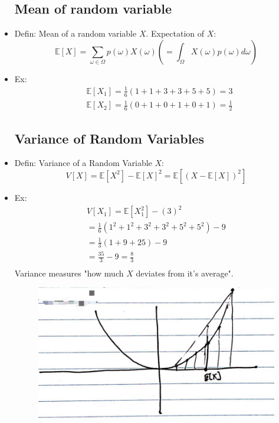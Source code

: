 \begin{itemize}
\subsection{Mean of  random variable}
\item Defin: Mean of a random variable $X$. \newline
Expectation of $X$: 
$$
\mathbb{E}[X]=\sum_{\omega \in \Omega} p(\omega) X(\omega)\left(=\int_{\Omega} X(\omega) p(\omega) d \omega\right)
$$
\item Ex: 
 $$\begin{aligned}
& \mathbb{E}\left[X_{1}\right]=\frac{1}{6}(1+1+3+3+5+5)=3 \\
& \mathbb{E}\left[X_{2}\right]=\frac{1}{6}(0+1+0+1+0+1)=\frac{1}{2}
\end{aligned}
$$
\subsection{Variance of  Random Variables}
\item Defin: Variance of a Random Variable $X$:  
$$
V[X]=\mathbb{E}\left[X^{2}\right]-\mathbb{E}[X]^{2}=\mathbb{E}\left[(X-\mathbb{E}[X])^{2}\right]
$$
\item Ex: 
$$
\begin{array}{l} V\left[X_{1}\right]=\mathbb{E}\left[X_{1}^{2}\right]-(3)^{2}\\
	= \frac{1}{6}\left(1^{2}+1^{2}+3^{2}+3^{2}+5^{2}+5^{2}\right)-9\\
	=\frac{1}{3}(1+9+25)-9\\
	=\frac{35}{3}-9=\frac{8}{3}\\
\end{array}$$ \newline
Variance measures "how much $X$ deviates from it's average".

 \begin{figure}
	\centering
	\includegraphics[width=.35\textwidth]{../figures/probability4.png}  
\end{figure}	


\end{itemize}
